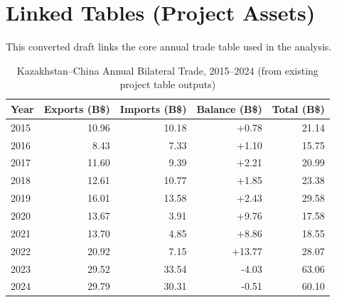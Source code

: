 \documentclass[12pt]{article}
\begin{document}
\section{Linked Tables (Project Assets)}
This converted draft links the core annual trade table used in the analysis.

\begin{table}[H]
\centering
\small
\caption{Kazakhstan--China Annual Bilateral Trade, 2015--2024 (from existing project table outputs)}
\label{tab:pd_annual}
\begin{tabular}{lrrrr}
\toprule
Year & Exports (B\$) & Imports (B\$) & Balance (B\$) & Total (B\$) \\
\midrule
2015 & 10.96 & 10.18 & +0.78 & 21.14 \\
2016 & 8.43 & 7.33 & +1.10 & 15.75 \\
2017 & 11.60 & 9.39 & +2.21 & 20.99 \\
2018 & 12.61 & 10.77 & +1.85 & 23.38 \\
2019 & 16.01 & 13.58 & +2.43 & 29.58 \\
2020 & 13.67 & 3.91 & +9.76 & 17.58 \\
2021 & 13.70 & 4.85 & +8.86 & 18.55 \\
2022 & 20.92 & 7.15 & +13.77 & 28.07 \\
2023 & 29.52 & 33.54 & -4.03 & 63.06 \\
2024 & 29.79 & 30.31 & -0.51 & 60.10 \\
\bottomrule
\end{tabular}
\end{table}
\end{document}
